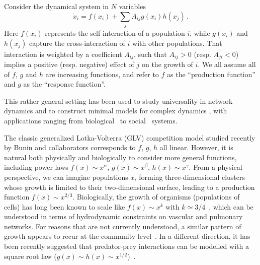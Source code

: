 
Consider the dynamical system in $N$ variables
\begin{equation}\label{dynamics}
    \dot{x}_i = f(x_i) + \sum_{j}A_{ij}g(x_i)h(x_j) \, .
\end{equation}
Here $f(x_i)$ represents the self-interaction of a population $i$, while $g(x_i)$ and $h(x_j)$ capture the cross-interaction of $i$ with other populations. That interaction is weighted by a coefficient $A_{ij}$, such that $A_{ij} > 0$ (resp.
$A_{ji} < 0$) implies a positive (resp.
negative) effect of $j$ on the growth of $i$. 
We all assume all of $f$, $g$ and $h$ are increasing functions, and refer to $f$ as the ``production function'' and $g$ as the ``response function''.

This rather general setting has been used to study universality in network dynamics \cite{Barzel2013} and to construct minimal models for complex dynamics \cite{Barzel2015}, with applications ranging from biological~\cite{Alon2006,Karlebach2008,Skinner2012} 
to social~\cite{Pastor-Satorras2001,Hufnagel2004,Dodds2005} systems.

The classic generalized Lotka-Volterra (GLV) competition model studied recently by Bunin and collaborators \cite{bunin2017ecological, biroli2018marginally} corresponds to $f$, $g$, $h$ all linear. 
However, it is natural both physically and biologically to consider more general functions, including power laws $f(x)\sim x^\alpha$, $g(x)\sim x^\beta$, $h(x) \sim x^\gamma$.
From a physical perspective, we can imagine populations $x_i$ forming three-dimensional clusters whose growth is limited to their two-dimensional surface, leading to a production function $f(x) \sim x^{2/3}$.
Biologically, the growth of organisms (populations of cells) has long been known to scale like $f(x) \sim x^k$ with $k\simeq 3/4$~\cite{Brown2004}, which can be understood in terms of hydrodynamic constraints on vascular and pulmonary networks.
For reasons that are not currently understood, a similar pattern of growth appears to recur at the community level~\cite{Hatton2015,Hatton2023}.
In a different direction, it has been recently suggested that predator-prey interactions can be modelled with a square root law ($g(x) \sim h(x) \sim x^{1/2}$)~\cite{Barbier2021,Mazzarisi2023}.
